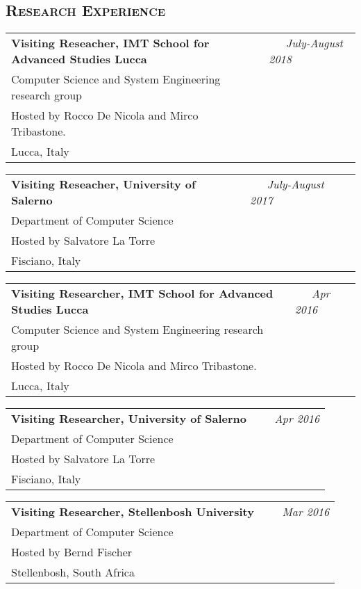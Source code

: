 \begin{resume}

\section{\bfseries \scshape  Research Experience}


\begin{tabular}{@{}p{4.6in}p{1.8in}}
{\bf Visiting Reseacher, IMT School for Advanced Studies Lucca}&
 \emph{~~~July-August 2018}\\
Computer Science and System Engineering research group&~\\
Hosted by Rocco De Nicola and Mirco Tribastone.~\\
Lucca, Italy~\\
\end{tabular}


\begin{tabular}{@{}p{4.6in}p{1.8in}}
{\bf Visiting Reseacher, University of Salerno}&
 \emph{~~~July-August 2017}\\
Department of Computer Science &~\\
Hosted by Salvatore La Torre~\\
Fisciano, Italy~\\
\end{tabular}


\begin{tabular}{@{}p{4.6in}p{1.8in}}
{\bf Visiting Researcher, IMT School for Advanced Studies Lucca}&
 \emph{~~~Apr 2016}\\
Computer Science and System Engineering research group&~\\
Hosted by Rocco De Nicola and Mirco Tribastone.~\\
Lucca, Italy~\\
\end{tabular}


\begin{tabular}{@{}p{4.6in}p{1.8in}}
{\bf Visiting Researcher, University of Salerno}&
 \emph{~~~Apr 2016}\\
Department of Computer Science &~\\
Hosted by Salvatore La Torre~\\
Fisciano, Italy~\\
\end{tabular}


\begin{tabular}{@{}p{4.6in}p{1.8in}}
{\bf Visiting Researcher, Stellenbosh University}&
 \emph{~~~Mar 2016}\\
Department of Computer Science &~\\
Hosted by Bernd Fischer~\\
Stellenbosh, South Africa~\\
\end{tabular}




\end{resume}
